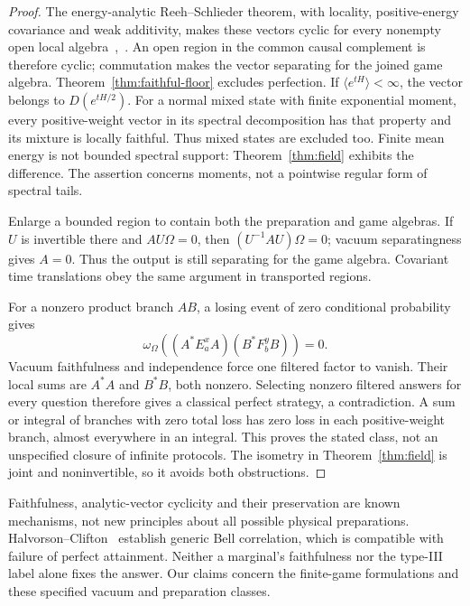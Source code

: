 \begin{proof}
The energy-analytic Reeh--Schlieder theorem, with locality, positive-energy covariance and weak additivity, makes these vectors cyclic for every nonempty open local algebra~\cite[Section 3]{CliftonHalvorson},~\cite[Section 3]{SummersReview}. An open region in the common causal complement is therefore cyclic; commutation makes the vector separating for the joined game algebra. Theorem~\ref{thm:faithful-floor} excludes perfection. If $\langle e^{tH}\rangle<\infty$, the vector belongs to $D(e^{tH/2})$. For a normal mixed state with finite exponential moment, every positive-weight vector in its spectral decomposition has that property and its mixture is locally faithful. Thus mixed states are excluded too. Finite mean energy is not bounded spectral support: Theorem~\ref{thm:field} exhibits the difference. The assertion concerns moments, not a pointwise regular form of spectral tails.

Enlarge a bounded region to contain both the preparation and game algebras. If $U$ is invertible there and $AU\Omega=0$, then $(U^{-1}AU)\Omega=0$; vacuum separatingness gives $A=0$. Thus the output is still separating for the game algebra. Covariant time translations obey the same argument in transported regions.

For a nonzero product branch $AB$, a losing event of zero conditional probability gives
\[
 \omega_\Omega((A^*E_a^xA)(B^*F_b^yB))=0.
\]
Vacuum faithfulness and independence force one filtered factor to vanish. Their local sums are $A^*A$ and $B^*B$, both nonzero. Selecting nonzero filtered answers for every question therefore gives a classical perfect strategy, a contradiction. A sum or integral of branches with zero total loss has zero loss in each positive-weight branch, almost everywhere in an integral. This proves the stated class, not an unspecified closure of infinite protocols. The isometry in Theorem~\ref{thm:field} is joint and noninvertible, so it avoids both obstructions.
\end{proof}

Faithfulness, analytic-vector cyclicity and their preservation are known mechanisms, not new principles about all possible physical preparations. Halvorson--Clifton~\cite{HalvorsonClifton} establish generic Bell correlation, which is compatible with failure of perfect attainment. Neither a marginal's faithfulness nor the type-III label alone fixes the answer. Our claims concern the finite-game formulations and these specified vacuum and preparation classes.
